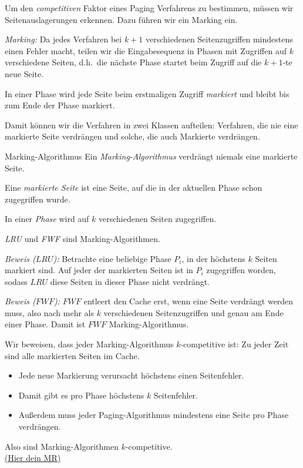 \documentclass{panikzettel}
\newcommand{\mrhere}[1]{\hyperref[mrExp:#1]{\hypertarget{mr:#1}{\small\sffamily(Hier dein MR)}}}
\begin{document}
Um den \emph{competitiven} Faktor eines Paging Verfahrens zu bestimmen, müssen wir Seitenauslagerungen erkennen. Dazu führen wir ein Marking ein.

\begin{halfboxl}
    \textit{Marking:} Da jedes Verfahren bei $k+1$ verschiedenen Seitenzugriffen mindestens einen Fehler macht, teilen wir die Eingabesequenz in Phasen mit Zugriffen auf $k$ verschiedene Seiten, d.h.\ die nächste Phase startet beim Zugriff auf die $k+1$-te neue Seite.

    In einer Phase wird jede Seite beim erstmaligen Zugriff \textit{markiert} und bleibt bis zum Ende der Phase markiert.

    Damit können wir die Verfahren in zwei Klassen aufteilen: Verfahren, die nie eine markierte Seite verdrängen und solche, die auch Markierte verdrängen.
\end{halfboxl}%
\begin{halfboxr}
\vspace{-\baselineskip}
    \begin{defi}{Marking-Algorithmus}
        Ein \emph{Marking-Algorithmus} verdrängt niemals eine markierte Seite.

        Eine \emph{markierte Seite} ist eine Seite, auf die in der aktuellen Phase schon zugegriffen wurde.

        In einer \emph{Phase} wird auf $k$ verschiedenen Seiten zugegriffen.
    \end{defi}
\end{halfboxr}

\textit{LRU} und \textit{FWF} sind Marking-Algorithmen.

\begin{halfboxl}
    \textit{Beweis ($LRU$):} Betrachte eine beliebige Phase $P_i$, in der höchstens $k$ Seiten markiert sind. Auf jeder der markierten Seiten ist in $P_i$ zugegriffen worden, sodass $LRU$ diese Seiten in dieser Phase nicht verdrängt.
\end{halfboxl}%
\begin{halfboxr}
\vspace{-\baselineskip}
    \textit{Beweis ($FWF$):} $FWF$ entleert den Cache erst, wenn eine Seite verdrängt werden muss, also nach mehr als $k$ verschiedenen Seitenzugriffen und genau am Ende einer Phase. Damit ist $FWF$ Marking-Algorithmus.
\end{halfboxr}

Wir beweisen, dass jeder Marking-Algorithmus $k$-competitive ist: Zu jeder Zeit sind alle markierten Seiten im Cache.
\begin{itemize}
    \item Jede neue Markierung verursacht höchstens einen Seitenfehler.
    \item Damit gibt es pro Phase höchstens $k$ Seitenfehler.
    \item Außerdem muss jeder Paging-Algorithmus mindestens eine Seite pro Phase verdrängen.
\end{itemize}
Also sind Marking-Algorithmen $k$-competitive.  \\
\mrhere{marking-comp}
\end{document}

